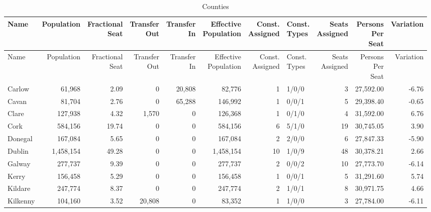 \documentclass[a4paper]{article}
\begin{document}
\begin{longtable}{lrrrrrrlrrr}
\caption{Counties}
\\ \toprule
Name &Population &\shortstack{Fractional\\Seat} &\shortstack{Transfer\\Out} &\shortstack{Transfer\\In} &\shortstack{Effective\\Population} &\shortstack{Const.\\Assigned} &\shortstack{Const.\\Types} &\shortstack{Seats\\Assigned} &\shortstack{Persons\\Per\\Seat} &Variation \\ \midrule
\endfirsthead
\toprule
Name &Population &\shortstack{Fractional\\Seat} &\shortstack{Transfer\\Out} &\shortstack{Transfer\\In} &\shortstack{Effective\\Population} &\shortstack{Const.\\Assigned} &\shortstack{Const.\\Types} &\shortstack{Seats\\Assigned} &\shortstack{Persons\\Per\\Seat} &Variation \\ \midrule
\endhead
\bottomrule
\endfoot
Carlow&61,968& 2.09&0&20,808&82,776&1&1/0/0&3&27,592.00&-6.76\\ 
Cavan&81,704& 2.76&0&65,288&146,992&1&0/0/1&5&29,398.40&-0.65\\ 
Clare&127,938& 4.32&1,570&0&126,368&1&0/1/0&4&31,592.00& 6.76\\ 
Cork&584,156&19.74&0&0&584,156&6&5/1/0&19&30,745.05& 3.90\\ 
Donegal&167,084& 5.65&0&0&167,084&2&2/0/0&6&27,847.33&-5.90\\ 
Dublin&1,458,154&49.28&0&0&1,458,154&10&1/0/9&48&30,378.21& 2.66\\ 
Galway&277,737& 9.39&0&0&277,737&2&0/0/2&10&27,773.70&-6.14\\ 
Kerry&156,458& 5.29&0&0&156,458&1&0/0/1&5&31,291.60& 5.74\\ 
Kildare&247,774& 8.37&0&0&247,774&2&1/0/1&8&30,971.75& 4.66\\ 
Kilkenny&104,160& 3.52&20,808&0&83,352&1&1/0/0&3&27,784.00&-6.11\\ 

\end{longtable}
\end{document}
